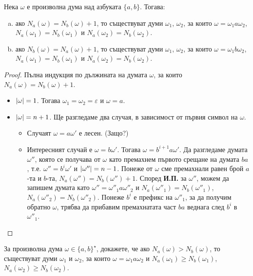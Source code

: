\begin{problem}
  \label{pr:nanb}
  Нека $\omega$ е произволна дума над азбуката $\{a,b\}$. 
  Тогава:
  \begin{enumerate}[a)]
  \item 
    ако $N_a(\omega) = N_b(\omega) + 1$, то съществуват думи $\omega_1$, $\omega_2$, за които
    $\omega = \omega_1 a \omega_2$, $N_a(\omega_1) = N_b(\omega_1)$ и $N_a(\omega_2) = N_b(\omega_2)$.
  \item
    ако $N_b(\omega) = N_a(\omega) + 1$, то съществуват думи $\omega_1$, $\omega_2$, за които
    $\omega = \omega_1 b \omega_2$, $N_a(\omega_1) = N_b(\omega_1)$ и $N_a(\omega_2) = N_b(\omega_2)$.
  \end{enumerate}
\end{problem}
\begin{proof}
  Пълна индукция по дължината на думата $\omega$, за които $N_a(\omega) = N_b(\omega)+1$.
  \begin{itemize}
  \item 
    $\lvert{\omega}\rvert = 1$. Тогава $\omega_1 = \omega_2 = \varepsilon$ и $\omega = a$.
  \item
    $\lvert{\omega}\rvert = n+1$. Ще разгледаме два случая, в зависимост от първия символ на $\omega$.
    \begin{itemize}
    \item 
      Случаят $\omega = a\omega'$ е лесен. (Защо?)
    \item
      Интересният случай е $\omega = b\omega'$.    
      Тогава $\omega = b^{i+1}a\omega'$. Да разгледаме думата $\omega''$, която се получава от $\omega$
      като премахнем първото срещане на думата $ba$, т.е. 
      $\omega'' = b^i\omega'$ и $\lvert{\omega''}\rvert = n-1$.
      Понеже от $\omega$ сме премахнали равен брой $a$-та и $b$-та, $N_a(\omega'') = N_b(\omega'')+1$.
      Според {\bf И.П.} за $\omega''$, можем да запишем думата като $\omega'' = \omega''_1a\omega''_2$
      и $N_a(\omega''_1) = N_b(\omega''_1)$, $N_a(\omega''_2) = N_b(\omega''_2)$.
      Понеже $b^i$ е префикс на $\omega''_1$, за да получим обратно $\omega$, трябва 
      да прибавим премахнатата част $ba$ веднага след $b^i$ в $\omega''_1$.
    \end{itemize}
  \end{itemize}
\end{proof}

\begin{problem}
  За произволна дума $\omega \in \{a,b\}^\star$, 
  докажете, че ако $N_a(\omega) > N_b(\omega)$, то съществуват думи $\omega_1$ и $\omega_2$,
  за които $\omega = \omega_1 a \omega_2$ и $N_a(\omega_1) \geq N_b(\omega_1)$, $N_a(\omega_2) \geq N_b(\omega_2)$.
\end{problem}

